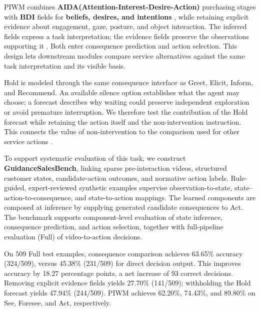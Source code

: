 \documentclass{article}
\begin{document}
PIWM combines \textbf{AIDA(Attention-Interest-Desire-Action)} purchasing stages \citep{barry1987development} with
\textbf{BDI} fields for\textbf{ beliefs, desires, and intentions} \citep{rao1995bdi},
while retaining explicit evidence about engagement, gaze, posture, and
object interaction. The inferred fields express a task interpretation;
the evidence fields preserve the observations supporting it
\citep{rabinowitz2018machine, bai2025qwen25vltechnicalreport}. Both
enter consequence prediction and action selection. This design lets
downstream modules compare service alternatives against the same task
interpretation and its visible basis.

Hold is modeled through the same consequence interface as Greet, Elicit,
Inform, and Recommend. An available silence option establishes what the
agent may choose; a forecast describes why waiting could preserve
independent exploration or avoid premature interruption. We therefore
test the contribution of the Hold forecast while retaining the action
itself and the non-intervention instruction. This connects the value of
non-intervention to the comparison used for other service actions
\citep{horvitz1999principles, lu2024proactive}.

To support systematic evaluation of this task, we construct \textbf{GuidanceSalesBench}, linking sparse pre-interaction videos, structured customer states, candidate-action outcomes, and normative action labels. Rule-guided, expert-reviewed synthetic examples
supervise observation-to-state, state--action-to-consequence, and
state-to-action mappings. The learned components are composed at
inference by supplying generated candidate consequences to Act.
The benchmark supports component-level evaluation of state inference, consequence prediction, and action selection, together with full-pipeline evaluation (Full) of video-to-action decisions.

On 509 Full test examples, consequence comparison achieves 63.65\% accuracy (324/509), versus 45.38\% (231/509) for direct decision output. This improves accuracy by 18.27 percentage points, a net increase of 93 correct decisions. Removing explicit evidence fields yields 27.70\% (141/509); withholding the Hold forecast yields 47.94\% (244/509). PIWM achieves 62.20\%, 74.43\%, and 89.80\% on See, Foresee, and Act, respectively.

\end{document}
